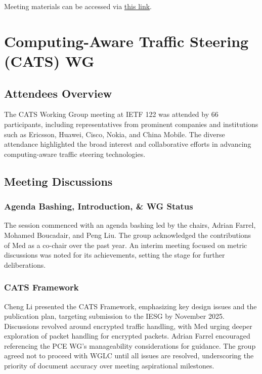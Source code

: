 \documentclass{article}
\begin{document}
Meeting materials can be accessed via \href{https://datatracker.ietf.org/meeting/122/materials/slides-122-bmwg-ietf-122-bmwg-chairs-slides-00}{this link}.



\newpage

\section{Computing-Aware Traffic Steering (CATS) WG}

\subsection{Attendees Overview}
The CATS Working Group meeting at IETF 122 was attended by 66 participants, including representatives from prominent companies and institutions such as Ericsson, Huawei, Cisco, Nokia, and China Mobile. The diverse attendance highlighted the broad interest and collaborative efforts in advancing computing-aware traffic steering technologies.

\subsection{Meeting Discussions}

\subsubsection{Agenda Bashing, Introduction, \& WG Status}
The session commenced with an agenda bashing led by the chairs, Adrian Farrel, Mohamed Boucadair, and Peng Liu. The group acknowledged the contributions of Med as a co-chair over the past year. An interim meeting focused on metric discussions was noted for its achievements, setting the stage for further deliberations.

\subsubsection{CATS Framework}
Cheng Li presented the CATS Framework, emphasizing key design issues and the publication plan, targeting submission to the IESG by November 2025. Discussions revolved around encrypted traffic handling, with Med urging deeper exploration of packet handling for encrypted packets. Adrian Farrel encouraged referencing the PCE WG's manageability considerations for guidance. The group agreed not to proceed with WGLC until all issues are resolved, underscoring the priority of document accuracy over meeting aspirational milestones.
\end{document}
